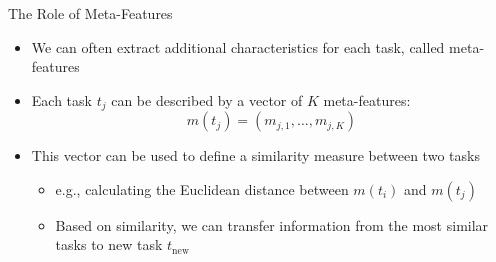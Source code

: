 

%
%
%

\begin{frame}[c]{The Role of Meta-Features}

\begin{itemize}
    \item We can often extract additional characteristics for each task, called \alert{meta-features}
    \item Each task $t_j$ can be described by a vector of $K$ meta-features:
        \begin{equation*}
            m(t_j) = (m_{j, 1}, \dots, m_{j, K})
        \end{equation*}
\medskip
\pause
    \item This vector can be used to define a \alert{similarity measure} between two tasks
    \begin{itemize}
    	\item e.g., calculating the Euclidean distance between $m(t_i)$ and $m(t_j)$
\smallskip
	    \item Based on similarity, we can transfer information from the most similar tasks to new task $t_{\text{new}}$
	\end{itemize}
\end{itemize}

\end{frame}

